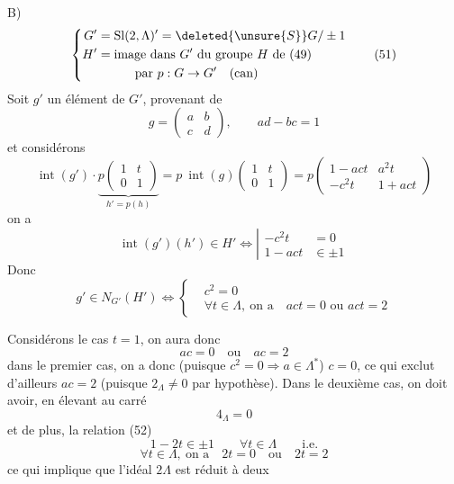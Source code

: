 B)
\[
\left\{\begin{aligned}
G'&=\mathrm{Sl}(2,\Lambda)'=\deleted{\unsure{S}}G/\pm1\\
H'&=\text{image dans }G'\text{ du groupe }H\text{ de (49)}\\
&\hspace{3em}\text{par }p:G\to G'\quad\text{(can)}
\end{aligned}\right.\tag*{(51)}
\]
Soit $g'$ un élément de $G'$, provenant de
\[
g=\begin{pmatrix}a&b\\c&d\end{pmatrix},\qquad ad-bc=1
\]
et considérons  
\[
\operatorname{int}(g')\cdot\underbrace{p\begin{pmatrix}1&t\\0&1\end{pmatrix}}_{h'=p(h)}
=p\ \operatorname{int}(g)\begin{pmatrix}1&t\\0&1\end{pmatrix}
=p\begin{pmatrix}1-act&a^2t\\-c^2t&1+act\end{pmatrix}
\]
on a
\[
\operatorname{int}(g')(h')\in H'\Longleftrightarrow
\left|\begin{aligned}-c^2t&=0\\1-act&\in\pm1\end{aligned}\right.\tag*{(52)}
\]
Donc
\[
g'\in N_{G'}(H')\Longleftrightarrow
\left\{\begin{aligned}&c^2=0\\&\forall t\in\Lambda,\ \text{on a}\quad act=0\text{ ou }act=2\end{aligned}\right.
\]

Considérons le cas $t=1$, on aura donc
\[
ac=0\quad\text{ou}\quad ac=2
\]
dans le premier cas, on a donc (puisque
$c^2=0\Longrightarrow a\in\Lambda^*$) $c=0$, ce qui exclut d'ailleurs
$ac=2$ (puisque $2_\Lambda\ne0$ par hypothèse). Dans
le deuxième cas, on doit avoir, en élevant
au carré
\[
4_\Lambda=0
\]
et de plus, la  relation (52)  
\[
1-2t\in\pm1\qquad\forall t\in\Lambda\qquad\text{i.e.}
\]
\[
\forall t\in\Lambda,\ \text{on a}\quad 2t=0\quad\text{ou}\quad 2t=2\tag*{(53)}
\]
ce qui implique que l'idéal $2\Lambda$ est réduit à deux
